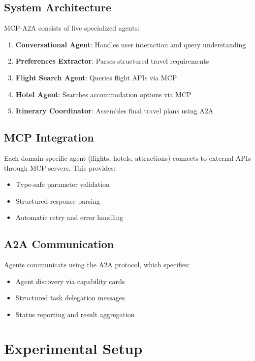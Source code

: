 \documentclass[11pt,a4paper]{article}
\begin{document}
\subsection{System Architecture}
MCP-A2A consists of five specialized agents:
\begin{enumerate}
    \item \textbf{Conversational Agent}: Handles user interaction and query understanding
    \item \textbf{Preferences Extractor}: Parses structured travel requirements
    \item \textbf{Flight Search Agent}: Queries flight APIs via MCP
    \item \textbf{Hotel Agent}: Searches accommodation options via MCP
    \item \textbf{Itinerary Coordinator}: Assembles final travel plans using A2A
\end{enumerate}

\subsection{MCP Integration}
Each domain-specific agent (flights, hotels, attractions) connects to external APIs through MCP servers. This provides:
\begin{itemize}
    \item Type-safe parameter validation
    \item Structured response parsing
    \item Automatic retry and error handling
\end{itemize}

\subsection{A2A Communication}
Agents communicate using the A2A protocol, which specifies:
\begin{itemize}
    \item Agent discovery via capability cards
    \item Structured task delegation messages
    \item Status reporting and result aggregation
\end{itemize}

\section{Experimental Setup}
\end{document}
